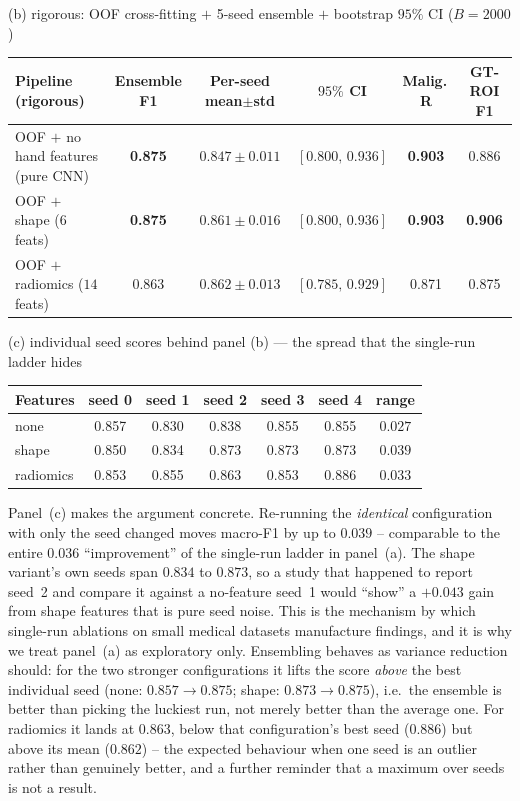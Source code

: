 \documentclass[11pt]{article}
\newcommand{\best}[1]{\textbf{#1}}
\begin{document}
\begin{table}[t]
(b) rigorous: OOF cross-fitting $+$ 5-seed ensemble $+$ bootstrap $95\%$ CI ($B=2000$)\\[2pt]
\scriptsize
\setlength{\tabcolsep}{4.4pt}
\begin{tabular}{@{}lccccc@{}}
\toprule
Pipeline (rigorous) & Ensemble F1 & Per-seed mean$\pm$std & $95\%$ CI & Malig.\,R & GT-ROI F1 \\
\midrule
OOF $+$ no hand features (pure CNN) & \best{0.875} & $0.847\pm0.011$ & $[0.800,\,0.936]$ & \best{0.903} & 0.886 \\
OOF $+$ shape ($6$ feats)           & \best{0.875} & $0.861\pm0.016$ & $[0.800,\,0.936]$ & \best{0.903} & \best{0.906} \\
OOF $+$ radiomics ($14$ feats)      & 0.863 & $0.862\pm0.013$ & $[0.785,\,0.929]$ & 0.871 & 0.875 \\
\bottomrule
\end{tabular}
\smallskip

(c) individual seed scores behind panel (b) --- the spread that the single-run ladder hides\\[2pt]
\scriptsize
\begin{tabular}{@{}lccccc c@{}}
\toprule
Features & seed 0 & seed 1 & seed 2 & seed 3 & seed 4 & range \\
\midrule
none      & 0.857 & 0.830 & 0.838 & 0.855 & 0.855 & $0.027$ \\
shape     & 0.850 & 0.834 & 0.873 & 0.873 & 0.873 & $0.039$ \\
radiomics & 0.853 & 0.855 & 0.863 & 0.853 & 0.886 & $0.033$ \\
\bottomrule
\end{tabular}
\end{table}

Panel~(c) makes the argument concrete. Re-running the \emph{identical}
configuration with only the seed changed moves macro-F1 by up to $0.039$ --
comparable to the entire $0.036$ ``improvement'' of the single-run ladder in
panel~(a). The shape variant's own seeds span $0.834$ to $0.873$, so a study that
happened to report seed~2 and compare it against a no-feature seed~1 would
``show'' a $+0.043$ gain from shape features that is pure seed noise. This is the
mechanism by which single-run ablations on small medical datasets manufacture
findings, and it is why we treat panel~(a) as exploratory only. Ensembling behaves
as variance reduction should: for the two stronger configurations it lifts the
score \emph{above} the best individual seed (none: $0.857\to0.875$; shape:
$0.873\to0.875$), i.e.\ the ensemble is better than picking the luckiest run, not
merely better than the average one. For radiomics it lands at $0.863$, below that
configuration's best seed ($0.886$) but above its mean ($0.862$) -- the expected
behaviour when one seed is an outlier rather than genuinely better, and a further
reminder that a maximum over seeds is not a result.
\end{document}
